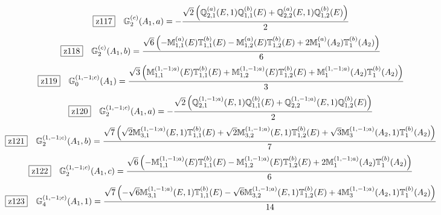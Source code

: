 \documentclass[fleqn,10pt,landscape]{jsarticle}
\begin{document}
\begin{dmath*}
\hspace*{3mm}\fbox{z117}\quad \mathbb{G}_{2}^{(c)}(A_{1},a)=- \frac{\sqrt{2} \left(\mathbb{Q}_{2,1}^{(a)}(E,1) \mathbb{Q}_{1,1}^{(b)}(E) + \mathbb{Q}_{2,2}^{(a)}(E,1) \mathbb{Q}_{1,2}^{(b)}(E)\right)}{2}
\end{dmath*}
\begin{dmath*}
\hspace*{3mm}\fbox{z118}\quad \mathbb{G}_{2}^{(c)}(A_{1},b)=\frac{\sqrt{6} \left(- \mathbb{M}_{1,1}^{(a)}(E) \mathbb{T}_{1,1}^{(b)}(E) - \mathbb{M}_{1,2}^{(a)}(E) \mathbb{T}_{1,2}^{(b)}(E) + 2 \mathbb{M}_{1}^{(a)}(A_{2}) \mathbb{T}_{1}^{(b)}(A_{2})\right)}{6}
\end{dmath*}
\begin{dmath*}
\hspace*{3mm}\fbox{z119}\quad \mathbb{G}_{0}^{(1,-1;c)}(A_{1})=\frac{\sqrt{3} \left(\mathbb{M}_{1,1}^{(1,-1;a)}(E) \mathbb{T}_{1,1}^{(b)}(E) + \mathbb{M}_{1,2}^{(1,-1;a)}(E) \mathbb{T}_{1,2}^{(b)}(E) + \mathbb{M}_{1}^{(1,-1;a)}(A_{2}) \mathbb{T}_{1}^{(b)}(A_{2})\right)}{3}
\end{dmath*}
\begin{dmath*}
\hspace*{3mm}\fbox{z120}\quad \mathbb{G}_{2}^{(1,-1;c)}(A_{1},a)=- \frac{\sqrt{2} \left(\mathbb{Q}_{2,1}^{(1,-1;a)}(E,1) \mathbb{Q}_{1,1}^{(b)}(E) + \mathbb{Q}_{2,2}^{(1,-1;a)}(E,1) \mathbb{Q}_{1,2}^{(b)}(E)\right)}{2}
\end{dmath*}
\begin{dmath*}
\hspace*{3mm}\fbox{z121}\quad \mathbb{G}_{2}^{(1,-1;c)}(A_{1},b)=\frac{\sqrt{7} \left(\sqrt{2} \mathbb{M}_{3,1}^{(1,-1;a)}(E,1) \mathbb{T}_{1,1}^{(b)}(E) + \sqrt{2} \mathbb{M}_{3,2}^{(1,-1;a)}(E,1) \mathbb{T}_{1,2}^{(b)}(E) + \sqrt{3} \mathbb{M}_{3}^{(1,-1;a)}(A_{2},1) \mathbb{T}_{1}^{(b)}(A_{2})\right)}{7}
\end{dmath*}
\begin{dmath*}
\hspace*{3mm}\fbox{z122}\quad \mathbb{G}_{2}^{(1,-1;c)}(A_{1},c)=\frac{\sqrt{6} \left(- \mathbb{M}_{1,1}^{(1,-1;a)}(E) \mathbb{T}_{1,1}^{(b)}(E) - \mathbb{M}_{1,2}^{(1,-1;a)}(E) \mathbb{T}_{1,2}^{(b)}(E) + 2 \mathbb{M}_{1}^{(1,-1;a)}(A_{2}) \mathbb{T}_{1}^{(b)}(A_{2})\right)}{6}
\end{dmath*}
\begin{dmath*}
\hspace*{3mm}\fbox{z123}\quad \mathbb{G}_{4}^{(1,-1;c)}(A_{1},1)=\frac{\sqrt{7} \left(- \sqrt{6} \mathbb{M}_{3,1}^{(1,-1;a)}(E,1) \mathbb{T}_{1,1}^{(b)}(E) - \sqrt{6} \mathbb{M}_{3,2}^{(1,-1;a)}(E,1) \mathbb{T}_{1,2}^{(b)}(E) + 4 \mathbb{M}_{3}^{(1,-1;a)}(A_{2},1) \mathbb{T}_{1}^{(b)}(A_{2})\right)}{14}
\end{dmath*}
\end{document}
